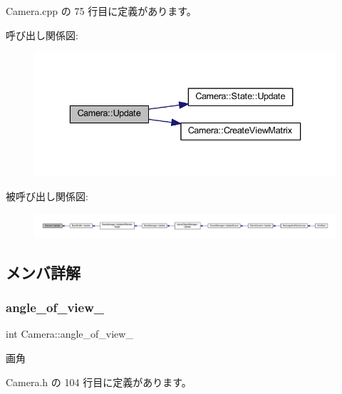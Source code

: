  Camera.\+cpp の 75 行目に定義があります。

呼び出し関係図\+:
\nopagebreak
\begin{figure}[H]
\begin{center}
\leavevmode
\includegraphics[width=336pt]{class_camera_a4a596a3ea1fdc7d244ba4268031a360b_cgraph}
\end{center}
\end{figure}
被呼び出し関係図\+:
\nopagebreak
\begin{figure}[H]
\begin{center}
\leavevmode
\includegraphics[width=350pt]{class_camera_a4a596a3ea1fdc7d244ba4268031a360b_icgraph}
\end{center}
\end{figure}


\subsection{メンバ詳解}
\mbox{\label{class_camera_a8c8ccaf83b140c65c458aa5d0077806c}} 
\subsubsection{\texorpdfstring{angle\+\_\+of\+\_\+view\+\_\+}{angle\_of\_view\_}}
{\footnotesize\ttfamily int Camera\+::angle\+\_\+of\+\_\+view\+\_\+\hspace{0.3cm}{\ttfamily [private]}}



画角 



 Camera.\+h の 104 行目に定義があります。

